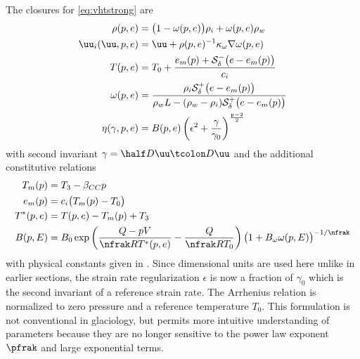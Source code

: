The closures for \eqref{eq:vhtstrong} are
\begin{subequations}\label{eq:vhtclosure}
  \begin{align}
    \rho(p,e)        & = \big(1-\omega(p,e) \big) \rho_i + \omega(p,e) \rho_w                            \\
    \uu_i(\uu,p,e)   & = \uu + \rho(p,e)^{-1} \kappa_\omega \nabla\omega(p,e) \label{eq:vhtclosure:uice} \\
    T(p,e)           & = T_0 + \frac{e_m(p) + \mathcal S_\delta^-\big(e - e_m(p)\big)}{c_i} \\
    \omega(p,e)      & = \frac{\rho_i \mathcal S_\delta^+\big(e - e_m(p)\big)}{\rho_w L - (\rho_w-\rho_i)\mathcal S_\delta^+\big(e - e_m(p)\big)} \\
    \eta(\gamma,p,e) & = B(p,e)\left(\epsilon^2 + \frac{\gamma}{\gamma_0} \right)^{\frac{\mathfrak{p}-2}{2}}
  \end{align}
\end{subequations}
with second invariant $\gamma = \half D\uu\tcolon D\uu$ and the additional constitutive relations
\begin{align*}
  T_m(p)   & = T_3 - \beta_{CC} p          \\
  e_m(p)   & = c_i \big(T_m(p) - T_0 \big) \\
  T^*(p,e) & = T(p,e) - T_m(p) + T_3       \\
  B(p,E)   & = B_0 \exp \left( \frac{Q - pV}{\nfrak R T^*(p,e)} - \frac{Q}{\nfrak R T_0} \right) \big(1 + B_\omega \omega(p,E) \big)^{-1/\nfrak}
\end{align*}
with physical constants given in .
Since dimensional units are used here unlike in earlier sections, the strain rate regularization $\epsilon$ is now a fraction of $\gamma_0$ which is the second invariant of a reference strain rate.
The Arrhenius relation is normalized to zero pressure and a reference temperature $T_0$.
This formulation is not conventional in glaciology, but permits more intuitive understanding of parameters because they are no longer sensitive to the power law exponent $\pfrak$ and large exponential terms.

